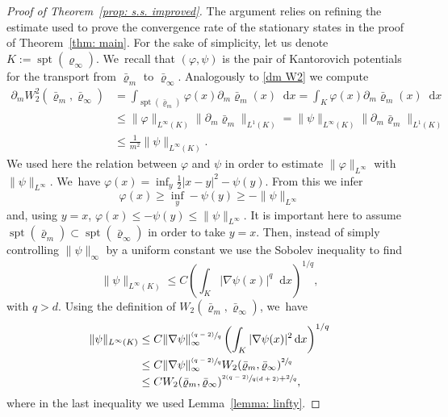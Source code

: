 \documentclass[JEP,XML,SOM,Unicode,published]{cedram}
\newcommand{\psfrac}[2]{\sfrac{(#1)}{#2}}
\DeclareMathOperator{\spt}{spt}
\newcommand{\dx}[1]{\mathop{}\!\mathrm{d} #1}
\theoremstyle{plain}
\theoremstyle{remark}
\begin{document}
\begin{proof}[Proof of Theorem~\ref{prop: s.s. improved}]

The argument relies on refining the estimate used to prove the convergence rate of the stationary states in the proof of Theorem~\ref{thm: main}. For the sake of simplicity, let us denote $K:=\spt(\varrho_\infty)$. We~recall that $(\varphi,\psi)$ is the pair of Kantorovich potentials for the transport from $\bar\varrho_m$ to $\bar\varrho_\infty$. Analogously to \eqref{dm W2} we compute
\begin{equation}\label{dm W2 new}
\begin{aligned}
\partial_m W_2^2(\bar\varrho_m, \bar\varrho_\infty)&= \int_{\spt{(\bar\varrho_m)}} \varphi (x) \partial_m \bar\varrho_m(x) \dx x= \int_{K} \varphi (x) \partial_m \bar\varrho_m(x) \dx x\\
&\leq \|\varphi\|_{L^\infty(K)} \|\partial_m \bar\varrho_m\|_{L^1(K)}=\|\psi\|_{L^\infty(K)} \|\partial_m \bar\varrho_m\|_{L^1(K)}\\
&\leq \frac{1}{m^2} \|\psi\|_{L^\infty(K)}.
\end{aligned}
\end{equation}
We used here the relation between $\varphi$ and $\psi $ in order to estimate $\|\varphi\|_{L^\infty}$ with $\|\psi\|_{L^\infty}$. We~have $\varphi(x)=\inf_y \frac12|x-y|^2-\psi(y)$. From this we infer
\[
\varphi(x)\geq \inf_y-\psi(y)\geq -\|\psi\|_{L^\infty}
\]
and, using $y=x$, $\varphi(x)\leq-\psi(y)\leq \|\psi\|_{L^\infty}$. It is important here to assume $\spt(\bar\varrho_m)\subset\spt (\bar\varrho_\infty)$ in order to take $y=x$. Then, instead of simply controlling $\|\psi\|_\infty$ by a uniform constant we use the Sobolev inequality to find
\begin{equation*}
\|\psi\|_{L^\infty(K)} \leq C \left(\int_{K} |\nabla \psi(x)|^{q} \dx x\right)^{1/{ q}},
\end{equation*}
with ${q}>d$. Using the definition of $W_2(\bar\varrho_m,\bar\varrho_\infty)$, we~have
\begin{align*}
\|\psi\|_{L^\infty(K)} &\leq {C}\|\nabla \psi\|_\infty^{\psfrac{{ q}-2}{{q}}} \left(\int_{K} |\nabla \psi(x)|^2 \dx x\right)^{1/{q}}\\
&\leq {C}\|\nabla \psi\|_\infty^{\psfrac{{ q}-2}{{q}}} W_2(\bar\varrho_m,\bar\varrho_\infty)^{\sfrac 2{q}}\\
&\leq { C}W_2(\bar\varrho_m,\bar\varrho_\infty)^{\sfrac{2({ q}-2)}{{ q}(d+2)} +\sfrac 2{ q}},
\end{align*}
where in the last inequality we used Lemma~\ref{lemma: linfty}.

\end{proof}
\end{document}
